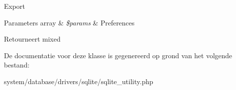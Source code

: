 Export


\begin{DoxyParams}[1]{Parameters}
array & {\em \$params} & Preferences \\
\hline
\end{DoxyParams}
\begin{DoxyReturn}{Retourneert}
mixed 
\end{DoxyReturn}


De documentatie voor deze klasse is gegenereerd op grond van het volgende bestand\+:\begin{DoxyCompactItemize}
\item 
system/database/drivers/sqlite/sqlite\+\_\+utility.\+php\end{DoxyCompactItemize}
